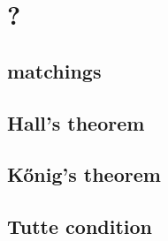 \documentclass[main]{subfiles}
\begin{document}

\section{?}

\subsection{matchings}

\subsection{Hall's theorem}
\subsection{Kőnig's theorem}
\subsection{Tutte condition}
\end{document}
